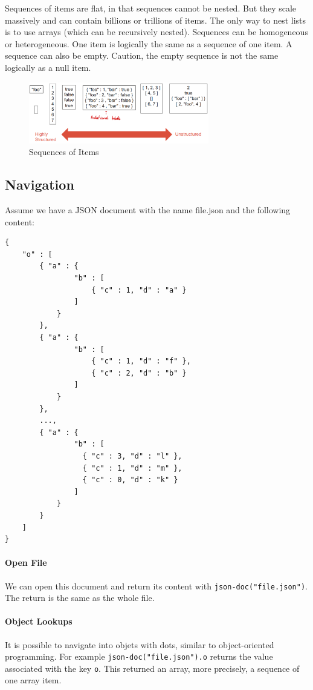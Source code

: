 Sequences of items are flat, in that sequences cannot be nested. But they scale massively and can contain billions or trillions of items. The only way to nest lists is to use arrays (which can be recursively nested). Sequences can be homogeneous or heterogeneous. One item is logically the same as a sequence of one item. A sequence can also be empty. Caution, the empty sequence is not the same logically as a null item.

\begin{figure}[h]
    \centering
    \includegraphics[width=0.7\textwidth]{Figures/SequenceofItems.png}
    \caption{Sequences of Items}
\end{figure}

\subsection{Navigation}

Assume we have a JSON document with the name file.json and the following content:
\begin{lstlisting}[style=json]
{
    "o" : [
        { "a" : {
                "b" : [
                    { "c" : 1, "d" : "a" }
                ]
            }
        },
        { "a" : {
                "b" : [
                    { "c" : 1, "d" : "f" },
                    { "c" : 2, "d" : "b" }
                ]
            }
        },
        ...,
        { "a" : {
                "b" : [
                  { "c" : 3, "d" : "l" },
                  { "c" : 1, "d" : "m" },
                  { "c" : 0, "d" : "k" }
                ]
            }
        }
    ]
}
\end{lstlisting}

\paragraph{Open File}
We can open this document and return its content with \texttt{json-doc("file.json")}. The return is the same as the whole file.

\paragraph{Object Lookups}
It is possible to navigate into objets with dots, similar to object-oriented programming. For example \texttt{json-doc("file.json").o} returns the value associated with the key \texttt{o}. This returned an array, more precisely, a sequence of one array item.


